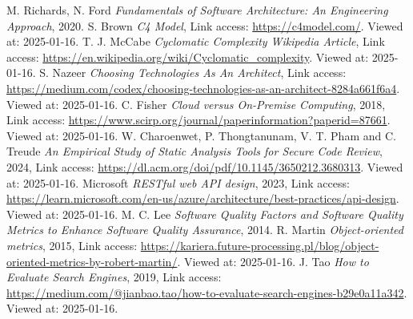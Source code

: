 \documentclass[12pt]{article}
\begin{document}
\begin{thebibliography}{100}
\addtolength{\leftmargin}{0.2in}
    \setlength{\itemindent}{-0.2in}

     M. Richards, N. Ford \emph{Fundamentals of Software Architecture: An Engineering Approach}, 2020.
     S. Brown \emph{C4 Model}, Link access: \url{https://c4model.com/}. Viewed at: 2025-01-16.
     T. J. McCabe \emph{Cyclomatic Complexity Wikipedia Article}, Link access: \url{https://en.wikipedia.org/wiki/Cyclomatic_complexity}. Viewed at: 2025-01-16.
     S. Nazeer \emph{Choosing Technologies As An Architect}, Link access: \url{https://medium.com/codex/choosing-technologies-as-an-architect-8284a661f6a4}. Viewed at: 2025-01-16.
     C. Fisher \emph{Cloud versus On-Premise Computing}, 2018, Link access: \url{https://www.scirp.org/journal/paperinformation?paperid=87661}. Viewed at: 2025-01-16.
     W. Charoenwet, P. Thongtanunam, V. T. Pham and C. Treude \emph{An Empirical Study of Static Analysis Tools for Secure Code Review}, 2024, Link access: \url{https://dl.acm.org/doi/pdf/10.1145/3650212.3680313}. Viewed at: 2025-01-16.
     Microsoft \emph{RESTful web API design}, 2023, Link access: \url{https://learn.microsoft.com/en-us/azure/architecture/best-practices/api-design}. Viewed at: 2025-01-16.
     M. C. Lee \emph{Software Quality Factors and Software Quality Metrics to Enhance Software Quality Assurance}, 2014.
     R. Martin \emph{Object-oriented metrics}, 2015, Link access: \url{https://kariera.future-processing.pl/blog/object-oriented-metrics-by-robert-martin/}. Viewed at: 2025-01-16.
     J. Tao \emph{How to Evaluate Search Engines}, 2019, Link access: \url{https://medium.com/@jianbao.tao/how-to-evaluate-search-engines-b29e0a11a342}. Viewed at: 2025-01-16.
\end{thebibliography}
\newpage %
\end{document}
